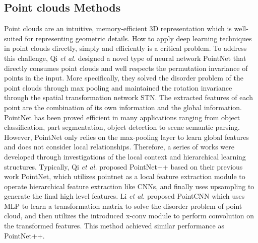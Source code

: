 \documentclass{cta-author}
\begin{document}
\subsection{Point clouds Methods}
Point clouds are an intuitive, memory-efficient 3D representation which is well-suited for representing geometric details. How to apply deep learning techniques in point clouds directly, simply and efficiently is a critical problem. To address this challenge, Qi \emph{et al.} \cite{qi2017pointnet} designed a novel type of neural network PointNet that directly consumes point clouds and well respects the permutation invariance of points in the input. More specifically, they solved the disorder problem of the point clouds through max pooling and maintained the rotation invariance through the spatial transformation network STN. The extracted features of each point are the combination of its own information and the global information. PointNet has been proved efficient in many applications ranging from object classification, part segmentation, object detection to scene semantic parsing. However, PointNet only relies on the max-pooling layer to learn global features and does not consider local relationships. Therefore, a series of works \cite{qi2017pointnet++,huang2018recurrent,wang2019dynamic,li2018pointcnn,engelmann2017exploring} were developed through investigations of the local context and hierarchical learning structures. Typically, Qi \emph{et al.} \cite{qi2017pointnet++} proposed PointNet++ based on their previous work PointNet, which utilizes pointnet as a local feature extraction module to operate hierarchical feature extraction like CNNs, and finally uses upsampling to generate the final high level features.
Li \emph{et al.} \cite{li2018pointcnn} proposed PointCNN which uses MLP to learn a transformation matrix to solve the disorder problem of point cloud, and then utilizes the introduced x-conv module to perform convolution on the transformed features. This method achieved similar performance as PointNet++.
\end{document}
